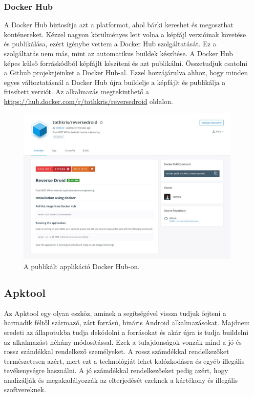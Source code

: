\documentclass{thesis-ekf}
\theoremstyle{definition}
\theoremstyle{remark}
\begin{document}
\subsubsection{Docker Hub}

A Docker Hub biztosítja azt a platformot, ahol bárki kereshet és megoszthat konténereket.
Kézzel nagyon körülményes lett volna a képfájl verzióinak követése és publikálása, ezért igénybe vettem a Docker Hub szolgáltatását.
Ez a szolgáltatás nem más, mint az automatikus buildek készítése.
A Docker Hub képes külső forráskódból képfájlt készíteni és azt publikálni.
Összetudjuk csatolni a Github projektjeinket a Docker Hub-al. 
Ezzel hozzájárulva ahhoz, hogy minden egyes változtatásnál a Docker Hub újra buildelje a képfájlt és publikálja a frissített verziót.
Az alkalmazás megtekinthető a \url{https://hub.docker.com/r/tothkris/reversedroid} oldalon.

\begin{figure}[!h]
	\centering
	\includegraphics[width=15cm]{pictures/docker_hub}
	\caption{A publikált applikáció Docker Hub-on.}
	\label{dockerhub}
\end{figure}

\subsection{Apktool}

Az Apktool egy olyan eszköz, aminek a segítségével vissza tudjuk fejteni a harmadik féltől származó, zárt forrású, bináris Android alkalmazásokat.
Majdnem eredeti az állapotukba tudja dekódolni a forrásokat és akár újra is tudja buildelni az alkalmazást néhány módosítással.
Ezek a tulajdonságok vonzák mind a jó és rossz szándékkal rendelkező személyeket.
A rossz számdékkal rendelkezőket természetesen azért, mert ezt a technológiát lehet kalózkodásra és egyéb illegális tevékenységre használni.
A jó számdékkal rendelkezőeket pedig azért, hogy analizálják és megakadályozzák az elterjedését ezeknek a kártékony és illegális szoftvereknek.
\end{document}
